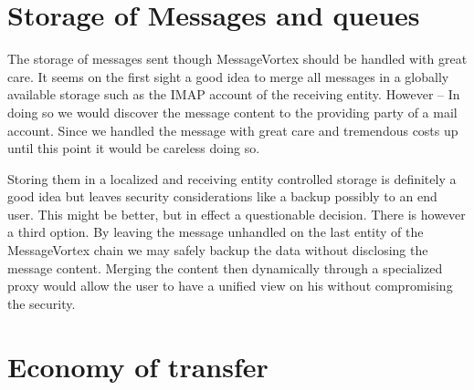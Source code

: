 
\section{Storage of Messages and queues}
The storage of messages sent though MessageVortex should be handled with great care. It seems on the first sight a good idea to merge all messages in a globally available storage such as the IMAP account of the receiving entity. However -- In doing so we would discover the message content to the providing party of a mail account. Since we handled the message with great care and tremendous costs up until this point it would be careless doing so. 

Storing them in a localized and receiving entity controlled storage is definitely a good idea but leaves security considerations like a backup possibly to an end user. This might be better, but in effect a questionable decision. There is however a third option. By leaving the message unhandled on the last entity of the MessageVortex chain we may safely backup the data without disclosing the message content. Merging the content then dynamically through a specialized proxy would allow the user to have a unified view on his without compromising the security.


\section{Economy of transfer}


